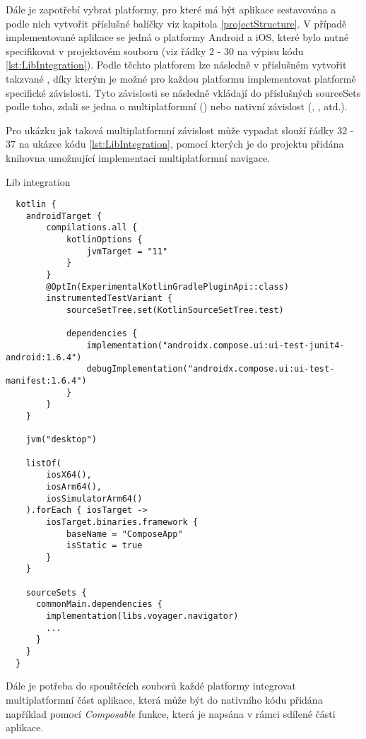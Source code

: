 Dále je zapotřebí vybrat platformy, pro které má být aplikace sestavována a podle nich vytvořit příslušné balíčky viz kapitola \ref{projectStructure}.
V případě implementované aplikace se jedná o platformy Android a iOS, které bylo nutné specifikovat v projektovém souboru 
 (viz řádky 2 - 30 na výpisu kódu \ref{lst:LibIntegration}).
Podle těchto platforem lze následně v příslušném  vytvořit takzvané , díky kterým je možné
pro každou platformu implementovat platformě specifické závislosti. Tyto závislosti se následně vkládají do příslušných
sourceSets podle toho, zdali se jedna o multiplatformní () nebo nativní závislost (, , atd.).

Pro ukázku jak taková multiplatformní závislost může vypadat slouží řádky 32 - 37 na ukázce kódu \ref{lst:LibIntegration}, pomocí 
kterých je do projektu přidána knihovna umožnující implementaci multiplatformní navigace.
\begin{listing}[H]
\caption{Lib integration}\label{lst:LibIntegration}
\begin{verbatim}
  kotlin {
    androidTarget {
        compilations.all {
            kotlinOptions {
                jvmTarget = "11"
            }
        }
        @OptIn(ExperimentalKotlinGradlePluginApi::class)
        instrumentedTestVariant {
            sourceSetTree.set(KotlinSourceSetTree.test)

            dependencies {
                implementation("androidx.compose.ui:ui-test-junit4-android:1.6.4")
                debugImplementation("androidx.compose.ui:ui-test-manifest:1.6.4")
            }
        }
    }

    jvm("desktop")

    listOf(
        iosX64(),
        iosArm64(),
        iosSimulatorArm64()
    ).forEach { iosTarget ->
        iosTarget.binaries.framework {
            baseName = "ComposeApp"
            isStatic = true
        }
    }

    sourceSets {
      commonMain.dependencies {
        implementation(libs.voyager.navigator)
        ...
      }
    }
  }  
\end{verbatim}
\end{listing}

Dále je potřeba do spouštěcích souborů každé platformy integrovat multiplatformní část aplikace, která může být do nativního kódu přidána
například pomocí \textit{Composable} funkce, která je napsána v rámci sdílené části aplikace.

